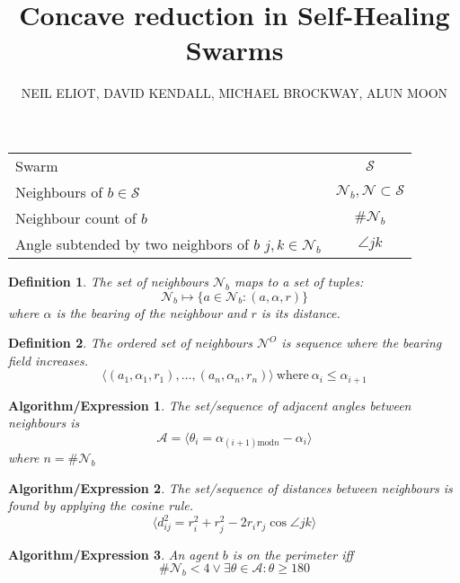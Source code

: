\documentclass{ieeeaccess}
\begin{document}
\renewcommand{\caption}[1]{}
\title{Concave reduction in Self-Healing Swarms}
\author{\uppercase{Neil Eliot},
\uppercase{David Kendall, Michael Brockway, Alun Moon}}
\address[1]{Northumbria University, Department of Computing and Information Sciences, Newcastle upon Tyne, NE1 8ST}

\begin{tabular}{p{}c}
	Swarm & $\mathcal{S}$ \\
	Neighbours of $b\in\mathcal{S}$ &
	$\mathcal{N}_b,\mathcal{N}\subset\mathcal{S}$ \\ \hline
	Neighbour count of $b$ & $\#\mathcal{N}_b$ \\
	Angle subtended by two neighbors of $b$ $j,k \in\mathcal{N}_b$ & $\angle jk$ \\
\end{tabular}

\newtheorem{defn}{Definition}
\newtheorem{algor}{Algorithm/Expression}
\begin{defn}
	The set of neighbours $\mathcal{N}_b$ maps to a set of tuples:
	\[
		\mathcal{N}_b \mapsto \{a\in\mathcal{N}_b : (a,\alpha, r)\}
	\]
where $\alpha$ is the bearing of the neighbour and $r$ is its distance.
\end{defn}

\begin{defn}
	The ordered set of neighbours $\mathcal{N}^O$ is  sequence  where the bearing field
	increases.
	\[
		\langle(a_1,\alpha_1,r_1),\ldots,(a_n,\alpha_n,r_n)\rangle\
		\mathrm{where}\ \alpha_i\leq\alpha_{i+1}
	\]
\end{defn}

\begin{algor}
	The set/sequence of adjacent angles between neighbours is
	\[
	\mathcal{A}=\langle \theta_i=\alpha_{(i+1)\mathrm{mod}n}-\alpha_i \rangle
	\]
	where $n=\#\mathcal{N}_b$
\end{algor}
\begin{algor}
	The set/sequence of distances between neighbours is found by applying the
	cosine rule.
	\[
		\langle d_{ij}^2 = r_i^2+r_j^2 -2r_ir_j\cos\angle jk\rangle
	\]
\end{algor}

\begin{algor}
	An agent $b$ is on the perimeter iff
	\[
		\#\mathcal{N}_b<4 \vee \exists \theta \in \mathcal{A} :
		\theta \geq 180
	\]
\end{algor}
\end{document}
